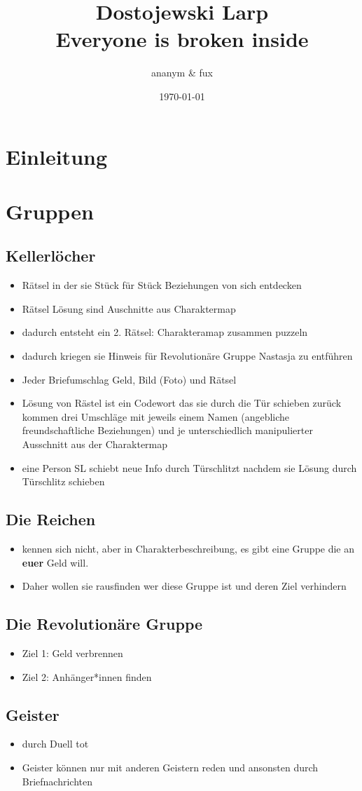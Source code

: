 \documentclass[12pt, a4paper, openany]{report}
\title{
  {\large{Dostojewski Larp}}\\
    {Everyone is broken inside}\\
    {\bigskip}
}
\author{ananym \& fux}
\date{\today}
\begin{document}
\maketitle 
\tableofcontents
\chapter{Einleitung}

\chapter{Gruppen}
\section{Kellerlöcher}
\begin{itemize}
\item Rätsel in der sie Stück für Stück Beziehungen von sich entdecken 
\item Rätsel Lösung sind Auschnitte aus Charaktermap
\item dadurch entsteht ein 2. Rätsel: Charakteramap zusammen puzzeln 
\item dadurch kriegen sie Hinweis für Revolutionäre Gruppe Nastasja zu entführen
\item Jeder Briefumschlag Geld, Bild (Foto) und Rätsel 
\item Lösung von Rästel ist ein Codewort das sie durch die Tür schieben zurück kommen drei Umschläge mit jeweils einem Namen (angebliche freundschaftliche Beziehungen) und je unterschiedlich manipulierter Ausschnitt aus der Charaktermap
\item eine Person SL schiebt neue Info durch Türschlitzt nachdem sie Lösung durch Türschlitz schieben 
\end{itemize}
 
\section{Die Reichen}
\begin{itemize}
\item kennen sich nicht, aber in Charakterbeschreibung, es gibt eine Gruppe die an \textbf{euer} Geld will. 
\item Daher wollen sie rausfinden wer diese Gruppe ist und deren Ziel verhindern
\end{itemize}

\section{Die Revolutionäre Gruppe}
\begin{itemize}
\item Ziel 1: Geld verbrennen 
\item Ziel 2: Anhänger*innen finden
\end{itemize}
\section{Geister}
\begin{itemize} 
\item durch Duell tot 
\item Geister können nur mit anderen Geistern reden und ansonsten durch Briefnachrichten 

\end{itemize}
\end{document}

